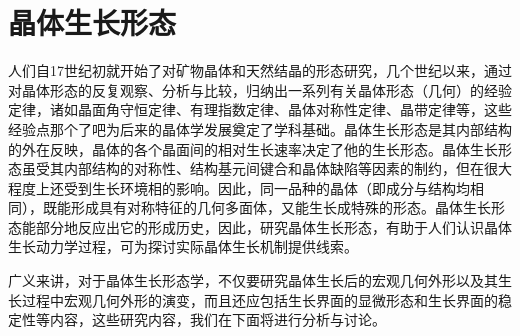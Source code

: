 \section{晶体生长形态}
人们自17世纪初就开始了对矿物晶体和天然结晶的形态研究，几个世纪以来，通过对晶体形态的反复观察、分析与比较，归纳出一系列有关晶体形态（几何）的经验定律，诸如晶面角守恒定律、有理指数定律、晶体对称性定律、晶带定律等，这些经验点那个了吧为后来的晶体学发展奠定了学科基础。晶体生长形态是其内部结构的外在反映，晶体的各个晶面间的相对生长速率决定了他的生长形态。晶体生长形态虽受其内部结构的对称性、结构基元间键合和晶体缺陷等因素的制约，但在很大程度上还受到生长环境相的影响。因此，同一品种的晶体（即成分与结构均相同），既能形成具有对称特征的几何多面体，又能生长成特殊的形态。晶体生长形态能部分地反应出它的形成历史，因此，研究晶体生长形态，有助于人们认识晶体生长动力学过程，可为探讨实际晶体生长机制提供线索。

广义来讲，对于晶体生长形态学，不仅要研究晶体生长后的宏观几何外形以及其生长过程中宏观几何外形的演变，而且还应包括生长界面的显微形态和生长界面的稳定性等内容，这些研究内容，我们在下面将进行分析与讨论。

